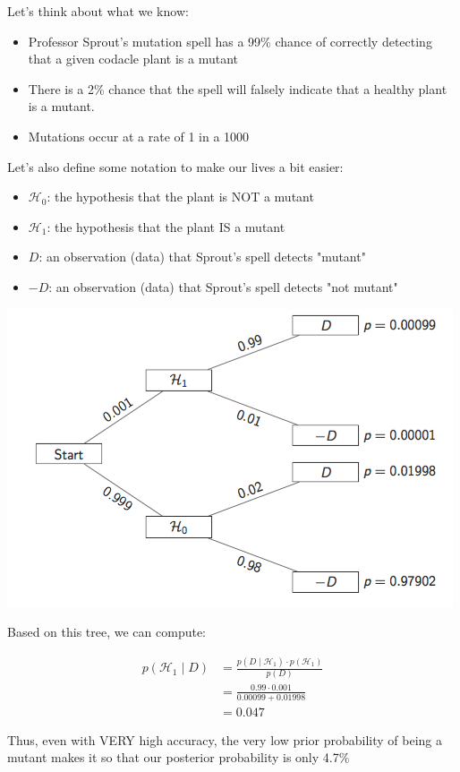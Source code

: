 \documentclass[11pt]{article}
\begin{document}
Let's think about what we know:
\begin{itemize}
\item Professor Sprout’s mutation spell has a 99\% chance of correctly detecting that a given codacle plant is a mutant
\item There is a 2\% chance that the spell will falsely indicate that a healthy plant is a mutant.
\item Mutations occur at a rate of 1 in a 1000
\end{itemize}

Let's also define some notation to make our lives a bit easier:

\begin{itemize}
\item $\mathcal{H}_0$: the hypothesis that the plant is NOT a mutant
\item $\mathcal{H}_1$: the hypothesis that the plant IS a mutant
\item $D$: an observation (data) that Sprout's spell detects "mutant"
\item $-D$: an observation (data) that Sprout's spell detects "not mutant"
\end{itemize}

\includegraphics[width=.9\linewidth]{figures/week8/decisionTree.png}

Based on this tree, we can compute:

\begin{align*}
p(\mathcal{H_1}\mid D) & = \frac{p(D\mid \mathcal{H}_1)\cdot p(\mathcal{H}_1)}{p(D)}\\
&= \frac{0.99\cdot 0.001}{0.00099+0.01998}\\
&= 0.047
\end{align*}

Thus, even with VERY high accuracy, the very low prior probability of being a mutant makes it so that our posterior probability is only 4.7\% 
\end{document}
